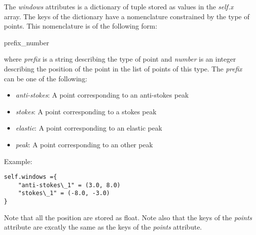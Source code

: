 The \textit{windows} attributes is a dictionary of tuple stored as values in the \textit{self.x} array. The keys of the dictionary have a nomenclature constrained by the type of points. This nomenclature is of the following form:
\begin{center}
    prefix\_number
\end{center}
where \textit{prefix} is a string describing the type of point and \textit{number} is an integer describing the position of the point in the list of points of this type. The \textit{prefix} can be one of the following:
\begin{itemize}
    \item \textit{anti-stokes}: A point corresponding to an anti-stokes peak
    \item \textit{stokes}: A point corresponding to a stokes peak
    \item \textit{elastic}: A point corresponding to an elastic peak
    \item \textit{peak}: A point corresponding to an other peak
\end{itemize}

Example:
\begin{lstlisting}
self.windows ={
    "anti-stokes\_1" = (3.0, 8.0)
    "stokes\_1" = (-8.0, -3.0)
}
\end{lstlisting}

Note that all the position are stored as float. Note also that the keys of the \textit{points} attribute are excatly the same as the keys of the \textit{points} attribute.
